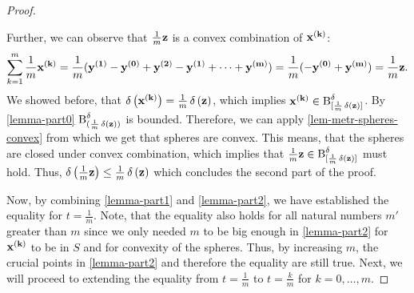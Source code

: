 \begin{proof}
\begin{proofpart}[$t \metro{\z} \geq \metro{t \z}$ for $t = \frac{1}{m} < d$ with $m \in \mathbb{N}$]
		Further, we can observe that $\frac{1}{m} \z$ is a convex combination of $\mathbf{x^{(k)}}$:
		$$\sum_{k=1}^m \frac{1}{m} \x = \frac{1}{m} (\y[1] - \y[0] + \y[2] - \y[1] + \dots + \y[m]) = \frac{1}{m} (-\y[0] + \y[m]) = \frac{1}{m} \z.$$
		We showed before, that $\metro{\x} = \frac{1}{m}\metro{\z}$, which implies $\x \in  \cball{\frac{1}{m}\metro{\z}}$.
		By \cref{lemma-part0} $\ball{\frac{1}{m} \metro{\z}}$ is bounded. Therefore, we can apply \cref{lem-metr-spheres-convex} from which we get that spheres are convex. This means, that the spheres are closed under convex combination, which implies that $\frac{1}{m} \z \in \cball{\frac{1}{m} \metro{\z}}$ must hold. Thus, $\metro{\frac1m \z} \leq \frac1m \metro{\z}$ which concludes the second part of the proof.
	\end{proofpart}




	Now, by combining \cref{lemma-part1} and \cref{lemma-part2}, we have established the equality for $t = \frac{1}{m}$. Note, that the equality also holds for all natural numbers $m'$ greater than $m$ since we only needed $m$ to be big enough in \cref{lemma-part2} for $\mathbf{x^{(k)}}$ to be in $S$ and for convexity of the spheres. Thus, by increasing $m$, the crucial points in \cref{lemma-part2} and therefore the equality are still true.
	Next, we will proceed to extending the equality from $t = \frac{1}{m}$ to $t =\frac{k}{m}$ for $k = 0, \dots, m$.





\end{proof}
